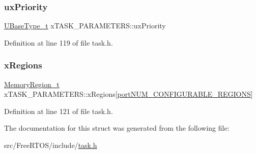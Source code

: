\subsubsection{\texorpdfstring{ux\+Priority}{uxPriority}}
{\footnotesize\ttfamily \hyperlink{portmacro_8h_a646f89d4298e4f5afd522202b11cb2e6}{U\+Base\+Type\+\_\+t} x\+T\+A\+S\+K\+\_\+\+P\+A\+R\+A\+M\+E\+T\+E\+R\+S\+::ux\+Priority}



Definition at line 119 of file task.\+h.

\mbox{\label{structx_t_a_s_k___p_a_r_a_m_e_t_e_r_s_ae8b97c6b7a344bf09b066b0844844d66}} 
\subsubsection{\texorpdfstring{x\+Regions}{xRegions}}
{\footnotesize\ttfamily \hyperlink{task_8h_af609504de4d78ff6f71477ae47c66e51}{Memory\+Region\+\_\+t} x\+T\+A\+S\+K\+\_\+\+P\+A\+R\+A\+M\+E\+T\+E\+R\+S\+::x\+Regions\mbox{[}\hyperlink{portable_8h_aca7e1a8a568a38b74cc9db10c8efebda}{port\+N\+U\+M\+\_\+\+C\+O\+N\+F\+I\+G\+U\+R\+A\+B\+L\+E\+\_\+\+R\+E\+G\+I\+O\+NS}\mbox{]}}



Definition at line 121 of file task.\+h.



The documentation for this struct was generated from the following file\+:\begin{DoxyCompactItemize}
\item 
src/\+Free\+R\+T\+O\+S/include/\hyperlink{task_8h}{task.\+h}\end{DoxyCompactItemize}
